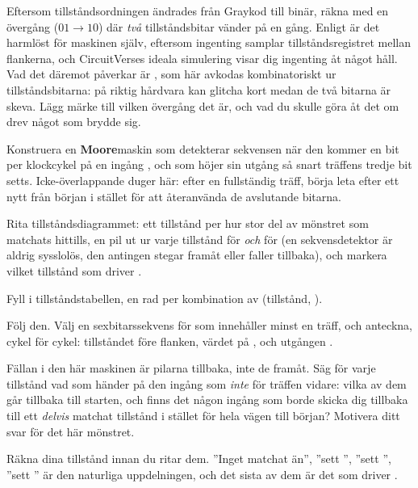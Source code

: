 \note[Tips]Eftersom tillståndsordningen ändrades från Graykod till binär, räkna med en övergång
($01 \to 10$) där \emph{två} tillståndsbitar vänder på en gång. Enligt  är det
harmlöst för maskinen själv, eftersom ingenting samplar tillståndsregistret mellan flankerna, och
CircuitVerses ideala simulering visar dig ingenting åt något håll. Vad det däremot påverkar är
, som här avkodas kombinatoriskt ur tillståndsbitarna: på riktig hårdvara kan 
glitcha kort medan de två bitarna är skeva. Lägg märke till vilken övergång det är, och vad du
skulle göra åt det om  drev något som brydde sig.


\label{c8:ex:moore101}
Konstruera en \textbf{Moore}maskin som detekterar sekvensen  när den kommer en bit per
klockcykel på en ingång , och som höjer sin utgång  så snart träffens tredje bit
setts. Icke-överlappande duger här: efter en fullständig träff, börja leta efter ett nytt
 från början i stället för att återanvända de avslutande bitarna.

 Rita tillståndsdiagrammet: ett tillstånd per hur stor del av mönstret som matchats
hittills, en pil ut ur varje tillstånd för  \emph{och} för  (en
sekvensdetektor är aldrig sysslolös, den antingen stegar framåt eller faller tillbaka), och markera
vilket tillstånd som driver .

 Fyll i tillståndstabellen, en rad per kombination av (tillstånd, ).

 Följ den. Välj en sexbitarssekvens för  som innehåller minst en träff, och
anteckna, cykel för cykel: tillståndet före flanken, värdet på , och utgången .

 Fällan i den här maskinen är pilarna tillbaka, inte de framåt. Säg för varje tillstånd vad
som händer på den ingång som \emph{inte} för träffen vidare: vilka av dem går tillbaka till starten,
och finns det någon ingång som borde skicka dig tillbaka till ett \emph{delvis} matchat tillstånd i
stället för hela vägen till början? Motivera ditt svar för det här mönstret.

\note[Tips]Räkna dina tillstånd innan du ritar dem. ”Inget matchat än”, ”sett ”, ”sett
”, ”sett ” är den naturliga uppdelningen, och det sista av dem är det som driver
.


